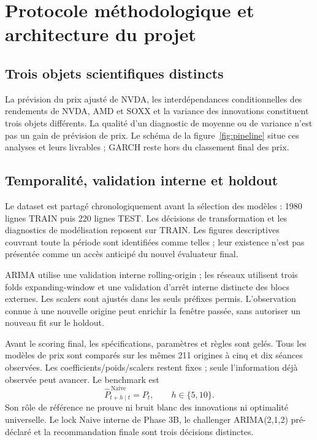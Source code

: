 \section{Protocole méthodologique et architecture du projet}
\label{sec:methodology}
\subsection{Trois objets scientifiques distincts}
La prévision du prix ajusté de NVDA, les interdépendances conditionnelles des
rendements de NVDA, AMD et SOXX et la variance des innovations constituent trois objets
différents. La qualité d'un diagnostic de moyenne ou de variance n'est pas un
gain de prévision de prix. Le schéma de la figure~\ref{fig:pipeline} situe ces
analyses et leurs livrables ; GARCH reste hors du classement final des prix.

\subsection{Temporalité, validation interne et holdout}
Le dataset est partagé chronologiquement avant la sélection des modèles :
1980 lignes TRAIN puis 220 lignes TEST. Les décisions de transformation et les
diagnostics de modélisation reposent sur TRAIN. Les figures descriptives couvrant
toute la période sont identifiées comme telles ; leur existence n'est pas
présentée comme un accès anticipé du nouvel évaluateur final.

ARIMA utilise une validation interne rolling-origin ; les réseaux utilisent
trois folds expanding-window et une validation d'arrêt interne distincte des
blocs externes. Les scalers sont ajustés dans les seuls préfixes permis.
L'observation connue à une nouvelle origine peut enrichir la fenêtre passée,
sans autoriser un nouveau fit sur le holdout.

Avant le scoring final, les spécifications, paramètres et règles sont gelés.
Tous les modèles de prix sont comparés sur les mêmes 211 origines à cinq et dix
séances observées. Les coefficients/poids/scalers restent fixes ; seule
l'information déjà observée peut avancer. Le benchmark est
\begin{equation}
\label{eq:naive}
\widehat P_{t+h\mid t}^{\,\mathrm{Naive}}=P_t,\qquad h\in\{5,10\}.
\end{equation}
Son rôle de référence ne prouve ni bruit blanc des innovations ni optimalité
universelle. Le lock Naive interne de Phase 3B, le challenger ARIMA(2,1,2)
pré-déclaré et la recommandation finale sont trois décisions distinctes.

